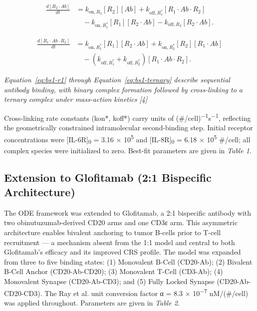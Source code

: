 \documentclass[11pt]{article}
\begin{document}
\begin{equation}
\begin{aligned}
\frac{d[R_2\cdot Ab]}{dt} &= k_{\mathrm{on},R_2}[R_2][Ab]+k_{\mathrm{off},R_1^{*}}[R_1\cdot Ab\cdot R_2]\\ &\quad-k_{\mathrm{on},R_1^{*}}[R_1][R_2\cdot Ab]-k_{\mathrm{off},R_2}[R_2\cdot Ab].
\end{aligned}
\label{eq:bs1-r2}
\end{equation}


\begin{equation}
\begin{aligned}
\frac{d[R_1\cdot Ab\cdot R_2]}{dt} &= k_{\mathrm{on},R_1^{*}}[R_1][R_2\cdot Ab]+k_{\mathrm{on},R_2^{*}}[R_2][R_1\cdot Ab]\\ &\quad-\left(k_{\mathrm{off},R_1^{*}}+k_{\mathrm{off},R_2^{*}}\right)[R_1\cdot Ab\cdot R_2].
\end{aligned}
\label{eq:bs1-ternary}
\end{equation}

\emph{Equation~\ref{eq:bs1-r1} through Equation~\ref{eq:bs1-ternary} describe sequential antibody binding, with binary complex formation followed by cross-linking to a ternary complex under mass-action kinetics [4]}
\par\medskip

Cross-linking rate constants (kon*, koff*) carry units of (\#/cell)\textsuperscript{−}\textsuperscript{1}s\textsuperscript{−}\textsuperscript{1}, reflecting the geometrically constrained intramolecular second-binding step. Initial receptor concentrations were [IL-6R]\textsubscript{0} = 3.16 × 10\textsuperscript{5} and [IL-8R]\textsubscript{0} = 6.18 × 10\textsuperscript{5} \#/cell; all complex species were initialized to zero. Best-fit parameters are given in \emph{Table 1}.
\par\medskip

\subsection{Extension to Glofitamab (2:1 Bispecific Architecture)}

The ODE framework was extended to Glofitamab, a 2:1 bispecific antibody with two obinutuzumab-derived CD20 arms and one CD3ε arm. This asymmetric architecture enables bivalent anchoring to tumor B-cells prior to T-cell recruitment — a mechanism absent from the 1:1 model and central to both Glofitamab’s efficacy and its improved CRS profile. The model was expanded from three to five binding states: (1) Monovalent B-Cell (CD20-Ab); (2) Bivalent B-Cell Anchor (CD20-Ab-CD20); (3) Monovalent T-Cell (CD3-Ab); (4) Monovalent Synapse (CD20-Ab-CD3); and (5) Fully Locked Synapse (CD20-Ab-CD20-CD3). The Ray et al. unit conversion factor α = 8.3 × 10\textsuperscript{−}\textsuperscript{7} nM/(\#/cell) was applied throughout. Parameters are given in \emph{Table 2}.
\par\medskip
\end{document}
